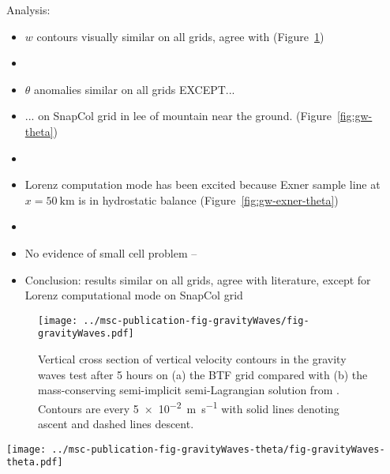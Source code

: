 \documentclass[twocol]{ametsoc}
\begin{document}
Analysis:
\begin{itemize}
	\item \(w\) contours visually similar on all grids, agree with \citet{melvin2010} (Figure~\ref{fig:gw-w})
	\item {}
	\item \(\theta\) anomalies similar on all grids EXCEPT...
	\item ... on SnapCol grid in lee of mountain near the ground. (Figure~\ref{fig:gw-theta})
	\item {}
	\item Lorenz computation mode has been excited because Exner sample line at $x = \SI{50}{\kilo\meter}$ is in hydrostatic balance (Figure~\ref{fig:gw-exner-theta})
	\item {}
	\item No evidence of small cell problem -- 
	\item Conclusion: results similar on all grids, agree with literature, except for Lorenz computational mode on SnapCol grid
\end{itemize}

\begin{figure}
	\centering
	\texttt{[image: ../msc-publication-fig-gravityWaves/fig-gravityWaves.pdf]}
%
	\caption{Vertical cross section of vertical velocity contours in the gravity waves test after 5 hours on (a) the BTF grid compared with (b) the mass-conserving semi-implicit semi-Lagrangian solution from \citet{melvin2010}.  Contours are every \SI{5e-2}{\meter\per\second} with solid lines denoting ascent and dashed lines descent.}
	\label{fig:gw-w}
\end{figure}

\begin{figure*}
	\centering
	\texttt{[image: ../msc-publication-fig-gravityWaves-theta/fig-gravityWaves-theta.pdf]}
%
	\caption{Anomalies in potential temperature in the gravity waves test after 5 hours.  The central domain in the lowest \SI{12}{\kilo\meter} is shown on (a) the BTF grid, and (c) the cut cell grid.  The four lowest layers of each grid are shown for (b) BTF, and (d) cut cell grids, using a narrower potential temperature scale.}
	\label{fig:gw-theta}
\end{figure*}
\end{document}

